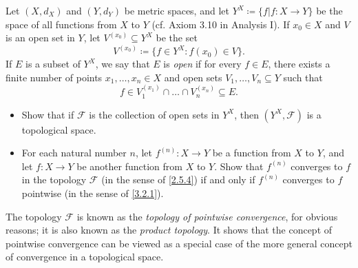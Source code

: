 \begin{ex}\label{ex:3.4.4}
  Let \((X, d_X)\) and \((Y, d_Y)\) be metric spaces, and let \(Y^X \coloneqq \{f | f : X \to Y \}\) be the space of all functions from \(X\) to \(Y\)
  (cf. Axiom 3.10 in Analysis I).
  If \(x_0 \in X\) and \(V\) is an open set in \(Y\), let \(V^{(x_0)} \subseteq Y^X\) be the set
  \[
    V^{(x_0)} \coloneqq \big\{f \in Y^X : f(x_0) \in V\big\}.
  \]
  If \(E\) is a subset of \(Y^X\), we say that \(E\) is \emph{open} if for every \(f \in E\), there exists a finite number of points \(x_1, \dots, x_n \in X\) and open sets \(V_1, \dots, V_n \subseteq Y\) such that
  \[
    f \in V_1^{(x_1)} \cap \dots \cap V_n^{(x_n)} \subseteq E.
  \]
  \begin{itemize}
    \item Show that if \(\mathcal{F}\) is the collection of open sets in \(Y^X\), then \((Y^X , \mathcal{F})\) is a topological space.
    \item For each natural number \(n\), let \(f^{(n)} : X \to Y\) be a function from \(X\) to \(Y\), and let \(f : X \to Y\) be another function from \(X\) to \(Y\).
          Show that \(f^{(n)}\) converges to \(f\) in the topology \(\mathcal{F}\) (in the sense of \cref{2.5.4}) if and only if \(f^{(n)}\) converges to \(f\) pointwise (in the sense of \cref{3.2.1}).
  \end{itemize}
  The topology \(\mathcal{F}\) is known as the \emph{topology of pointwise convergence}, for obvious reasons;
  it is also known as the \emph{product topology}.
  It shows that the concept of pointwise convergence can be viewed as a special case of the more general concept of convergence in a topological space.
\end{ex}

